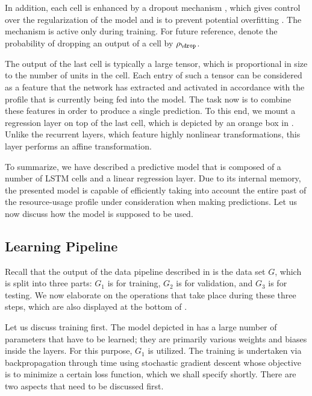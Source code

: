 In addition, each cell is enhanced by a dropout mechanism \cite{zaremba2014},
which gives control over the regularization of the model and is to prevent
potential overfitting \cite{hastie2013}. The mechanism is active only during
training. For future reference, denote the probability of dropping an output of
a cell by $\rho_\drop$.

The output of the last cell is typically a large tensor, which is proportional
in size to the number of units in the cell. Each entry of such a tensor can be
considered as a feature that the network has extracted and activated in
accordance with the profile that is currently being fed into the model. The task
now is to combine these features in order to produce a single prediction. To
this end, we mount a regression layer on top of the last cell, which is depicted
by an orange box in . Unlike the recurrent layers, which
feature highly nonlinear transformations, this layer performs an affine
transformation.

To summarize, we have described a predictive model that is composed of a number
of \ac{LSTM} cells and a linear regression layer. Due to its internal memory,
the presented model is capable of efficiently taking into account the entire
past of the resource-usage profile under consideration when making predictions.
Let us now discuss how the model is supposed to be used.

\subsection{Learning Pipeline}

Recall that the output of the data pipeline described in  is
the data set $G$, which is split into three parts: $G_1$ is for training, $G_2$
is for validation, and $G_3$ is for testing. We now elaborate on the operations
that take place during these three steps, which are also displayed at the bottom
of .

Let us discuss training first. The model depicted in  has a
large number of parameters that have to be learned; they are primarily various
weights and biases inside the layers. For this purpose, $G_1$ is utilized. The
training is undertaken via backpropagation through time using stochastic
gradient descent \cite{goodfellow2016} whose objective is to minimize a certain
loss function, which we shall specify shortly. There are two aspects that need
to be discussed first.

